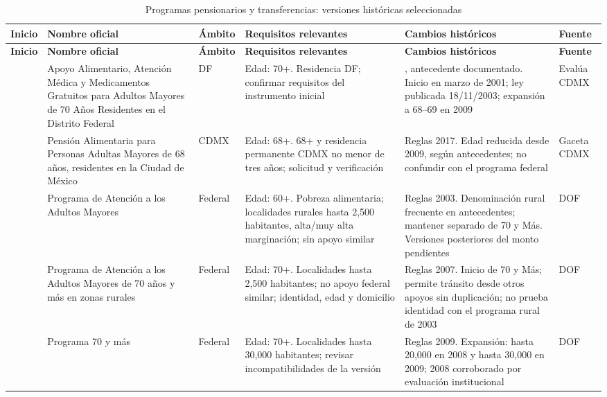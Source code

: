 \begingroup\small\singlespacing
\setlength{\tabcolsep}{3pt}
\begin{longtable}{>{\raggedright\arraybackslash}p{1.1cm}>{\raggedright\arraybackslash}p{3.2cm}>{\raggedright\arraybackslash}p{1.6cm}>{\raggedright\arraybackslash}p{3.5cm}>{\raggedright\arraybackslash}p{3.7cm}>{\raggedright\arraybackslash}p{1.6cm}}
\caption{Programas pensionarios y transferencias: versiones históricas seleccionadas}\label{tab:pensiones_historia}\\
\toprule \textbf{Inicio} & \textbf{Nombre oficial} & \textbf{Ámbito} & \textbf{Requisitos relevantes} & \textbf{Cambios históricos} & \textbf{Fuente} \\
\midrule\endfirsthead
\toprule \textbf{Inicio} & \textbf{Nombre oficial} & \textbf{Ámbito} & \textbf{Requisitos relevantes} & \textbf{Cambios históricos} & \textbf{Fuente} \\
\midrule\endhead
\bottomrule\endfoot
2001 & Apoyo Alimentario, Atención Médica y Medicamentos Gratuitos para Adultos Mayores de 70 Años Residentes en el Distrito Federal & DF & Edad: 70+. Residencia DF; confirmar requisitos del instrumento inicial & 2001, antecedente documentado. Inicio en marzo de 2001; ley publicada 18/11/2003; expansión a 68--69 en 2009 & Evalúa CDMX \citeyearpar{evalua2015} \\
2001 & Pensión Alimentaria para Personas Adultas Mayores de 68 años, residentes en la Ciudad de México & CDMX & Edad: 68+. 68+ y residencia permanente CDMX no menor de tres años; solicitud y verificación & Reglas 2017. Edad reducida desde 2009, según antecedentes; no confundir con el programa federal & Gaceta CDMX \citeyearpar{cdmx2017} \\
2003 & Programa de Atención a los Adultos Mayores & Federal & Edad: 60+. Pobreza alimentaria; localidades rurales hasta 2,500 habitantes, alta/muy alta marginación; sin apoyo similar & Reglas 2003. Denominación rural frecuente en antecedentes; mantener separado de 70 y Más. Versiones posteriores del monto pendientes & DOF \citeyearpar{rural2003} \\
2007 & Programa de Atención a los Adultos Mayores de 70 años y más en zonas rurales & Federal & Edad: 70+. Localidades hasta 2,500 habitantes; no apoyo federal similar; identidad, edad y domicilio & Reglas 2007. Inicio de 70 y Más; permite tránsito desde otros apoyos sin duplicación; no prueba identidad con el programa rural de 2003 & DOF \citeyearpar{setentamas2007} \\
2007 & Programa 70 y más & Federal & Edad: 70+. Localidades hasta 30,000 habitantes; revisar incompatibilidades de la versión & Reglas 2009. Expansión: hasta 20,000 en 2008 y hasta 30,000 en 2009; 2008 corroborado por evaluación institucional & DOF \citeyearpar{setentamas2009} \\

\end{longtable}
